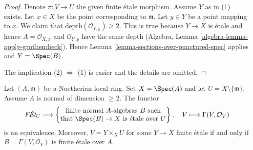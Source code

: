 \begin{proof}
Denote $\pi : V \to U$ the given finite \'etale morphism.
Assume $Y$ as in (1) exists. Let $x \in X$ be the point
corresponding to $\mathfrak m$.
Let $y \in Y$ be a point mapping to $x$. We claim that
$\text{depth}(\mathcal{O}_{Y, y}) \geq 2$.
This is true because $Y \to X$ is \'etale and hence
$A = \mathcal{O}_{X, x}$ and $\mathcal{O}_{Y, y}$ have
the same depth (Algebra, Lemma \ref{algebra-lemma-apply-grothendieck}).
Hence Lemma \ref{lemma-sections-over-punctured-spec}
applies and $Y = \Spec(B)$.

\medskip\noindent
The implication (2) $\Rightarrow$ (1) is easier and the
details are omitted.
\end{proof}

\begin{lemma}
\label{lemma-reformulate-purity-normal}
Let $(A, \mathfrak m)$ be a Noetherian local ring. Set $X = \Spec(A)$
and let $U = X \setminus \{\mathfrak m\}$. Assume $A$ is normal
of dimension $\geq 2$. The functor
$$
\textit{F\'Et}_U \longrightarrow
\left\{
\begin{matrix}
\text{finite normal }A\text{-algebras }B\text{ such} \\
\text{that }\Spec(B) \to X\text{ is \'etale over }U
\end{matrix}
\right\},
\quad
V \longmapsto \Gamma(V, \mathcal{O}_V)
$$
is an equivalence. Moreover, $V = Y \times_X U$ for some $Y \to X$
finite \'etale if and only if $B = \Gamma(V, \mathcal{O}_V)$
is finite \'etale over $A$.
\end{lemma}


